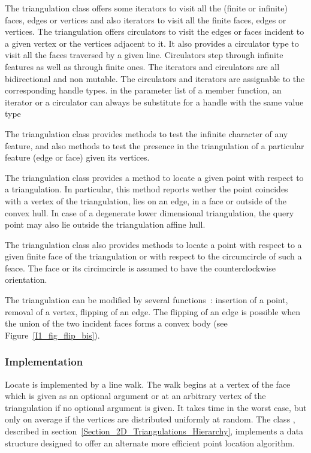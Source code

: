 The triangulation class offers 
some iterators to visit all the (finite or infinite)
faces, edges or vertices and also iterators to visit all the finite
faces, edges  or vertices.
The triangulation offers circulators  
 to visit the edges or faces 
incident to a given vertex or the  vertices 
adjacent to it. It also provides a circulator type
to visit all the faces
traversed by a given line.
Circulators step through infinite features as well as 
through finite ones. 
The iterators and circulators
are all bidirectional and non mutable.
The circulators and iterators are assignable to the 
corresponding handle types. 
in the parameter 
list of a member function,
an iterator or a circulator
can always be substitute 
for a handle with the same value type

The triangulation class provides methods to test
the infinite character of any feature,
and also methods to test the presence in the triangulation
of a particular feature (edge or face) given its vertices.

The triangulation class  provides a method to locate
a given point with respect to a triangulation.
In particular, this method reports wether the point
coincides with a vertex of the triangulation, lies on an edge,
in a face or outside of the convex hull. In case of a degenerate 
lower dimensional triangulation, the query point may also lie
outside the triangulation affine hull.

The triangulation class also provides
methods to locate a point with respect to
a given  finite face of the triangulation or with respect to the
circumcircle of such a feace.
The face or its circimcircle is assumed to have the  counterclockwise
orientation.

The triangulation can be modified by several functions~:
insertion of a point, removal of a vertex,
flipping  of an edge. The flipping of an edge
is possible when the union of the two incident faces
forms  a convex body (see Figure~\ref{I1_fig_flip_bis}). 

\subsubsection{Implementation}

Locate is implemented by a line walk. The walk
begins  at  a vertex of the face which
is given
as an optional argument  or at an arbitrary vertex of the triangulation
 if no optional argument is given. It takes
time  in the worst case, but only 
on average if the vertices are distributed uniformly at random.
The class ,
described in section~\ref{Section_2D_Triangulations_Hierarchy}, 
implements a data structure  designed to
offer an alternate  more efficient point location algorithm.

